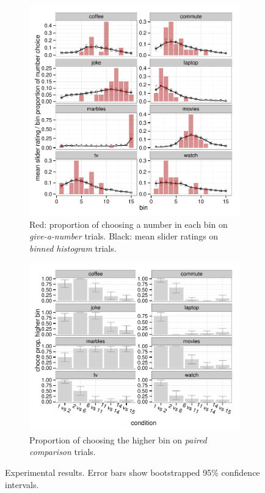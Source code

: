 \documentclass[10pt,letterpaper]{article}
\begin{document}
\begin{figure}[t!]
  \centering
  \begin{subfigure}{0.5\textwidth}
    \includegraphics[width = \textwidth]{plots/data_sliderNumber.pdf}
    \caption{Red: proportion of choosing a number in each bin on \emph{give-a-number} trials. Black: mean slider ratings on \emph{binned histogram} trials.}
    \label{fig:slider}
  \end{subfigure}

  \begin{subfigure}{0.5\textwidth}
    \includegraphics[width = \textwidth]{plots/data_choice.pdf}
    \caption{Proportion of choosing the higher bin on \emph{paired comparison} trials.}
    \label{fig:lighting}
  \end{subfigure}

  \caption{Experimental results. Error bars show bootstrapped 95\% confidence intervals.}
  \label{fig:Results}
\end{figure}
\end{document}
